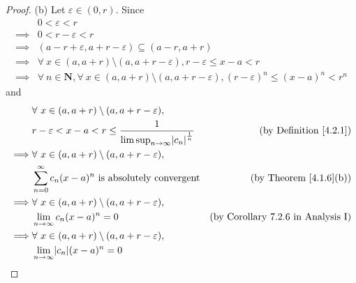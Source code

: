 \begin{proof}{(b)}
    Let \(\varepsilon \in (0, r)\).
    Since
    \begin{align*}
                 & 0 < \varepsilon < r                                                                                                               \\
        \implies & 0 < r - \varepsilon < r                                                                                                           \\
        \implies & (a - r + \varepsilon, a + r - \varepsilon) \subseteq (a - r, a + r)                                                               \\
        \implies & \forall\ x \in (a, a + r) \setminus (a, a + r - \varepsilon), r - \varepsilon \leq x - a < r                                      \\
        \implies & \forall\ n \in \mathbf{N}, \forall\ x \in (a, a + r) \setminus (a, a + r - \varepsilon), (r - \varepsilon)^n \leq (x - a)^n < r^n
    \end{align*}
    and
    \begin{align*}
                 & \forall\ x \in (a, a + r) \setminus (a, a + r - \varepsilon),                                                                        \\
                 & r - \varepsilon < x - a < r \leq \frac{1}{\limsup_{n \to \infty} \abs*{c_n}^\frac{1}{n}} & \text{(by Definition \ref{4.2.1})}        \\
        \implies & \forall\ x \in (a, a + r) \setminus (a, a + r - \varepsilon),                                                                        \\
                 & \sum_{n = 0}^\infty c_n (x - a)^n \text{ is absolutely convergent}                       & \text{(by Theorem \ref{4.1.6}(b))}        \\
        \implies & \forall\ x \in (a, a + r) \setminus (a, a + r - \varepsilon),                                                                        \\
                 & \lim_{n \to \infty} c_n (x - a)^n = 0                                                    & \text{(by Corollary 7.2.6 in Analysis I)} \\
        \implies & \forall\ x \in (a, a + r) \setminus (a, a + r - \varepsilon),                                                                        \\
                 & \lim_{n \to \infty} \abs*{c_n} (x - a)^n = 0                                                                                         \\

\end{align*}
\end{proof}
